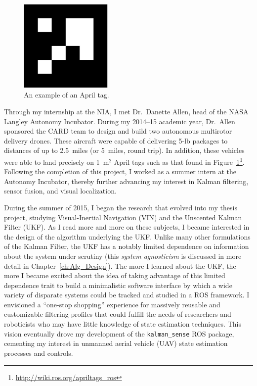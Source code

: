 \begin{figure}
  \centering
    \includegraphics[width=0.4\textwidth]{april_tag}
  \caption[Example April Tag]{An example of an April tag.}
  \label{fig:april_tag}
\end{figure}

Through my internship at the NIA, I met Dr.~Danette Allen, head of the NASA Langley Autonomy Incubator. During my 2014--15 academic year, Dr.~Allen sponsored the CARD team to design and build two autonomous multirotor delivery drones. These aircraft were capable of delivering 5\nobreakdash-lb packages to distances of up to 2.5~miles (or 5~miles, round trip). In addition, these vehicles were able to land precisely on 1~m$^2$ April tags such as that found in Figure~\ref{fig:april_tag}\footnote{\url{http://wiki.ros.org/apriltags\_ros}}. Following the completion of this project, I worked as a summer intern at the Autonomy Incubator, thereby further advancing my interest in Kalman filtering, sensor fusion, and visual localization.

During the summer of 2015, I began the research that evolved into my thesis project, studying Visual-Inertial Navigation (VIN) and the Unscented Kalman Filter (UKF). As I read more and more on these subjects, I became interested in the design of the algorithm underlying the UKF. Unlike many other formulations of the Kalman Filter, the UKF has a notably limited dependence on information about the system under scrutiny (this \textit{system agnosticism} is discussed in more detail in Chapter~\ref{ch:Alg_Design}). The more I learned about the UKF, the more I became excited about the idea of taking advantage of this limited dependence trait to build a minimalistic software interface by which a wide variety of disparate systems could be tracked and studied in a ROS framework. I envisioned a ``one-stop shopping'' experience for massively reusable and customizable filtering profiles that could fulfill the needs of researchers and roboticists who may have little knowledge of state estimation techniques. This vision eventually drove my development of the \texttt{kalman\_sense} ROS package, cementing my interest in unmanned aerial vehicle (UAV) state estimation processes and controls.


